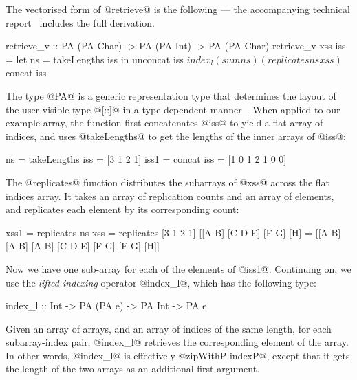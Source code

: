 The vectorised form of @retrieve@ is the following --- the accompanying technical report~\cite{lippmeier-etal:replicate-tr} includes the full derivation.
%
\begin{small}
\begin{code}
 retrieve_v :: PA (PA Char) -> PA (PA Int) -> PA (PA Char)
 retrieve_v xss iss
  = let ns = takeLengths iss
    in  unconcat iss 
         $ index_l (sum ns) (replicates ns xss)
         $ concat iss
\end{code}
\end{small}
\par
The type @PA@ is a generic representation type that determines the layout of the user-visible type @[::]@ in a type-dependent manner~\cite{chak-etal:DPH}. When applied to our example array, the function first concatenates @iss@ to yield a flat array of indices, and uses @takeLengths@ to get the lengths of the inner arrays of @iss@:
\begin{small}
\begin{code}
 ns   = takeLengths iss = [3      1  2    1]
 iss1 = concat iss      = [1 0 1  2  1 0  0]
\end{code}
\end{small}
%
\noindent
The @replicates@ function distributes the subarrays of @xss@ across the flat indices array. It takes an array of replication counts and an array of elements, and replicates each element by its corresponding count:
\begin{small}
\begin{code}
 xss1 = replicates ns xss
      = replicates [3 1 2 1] [[A B] [C D E] [F G] [H]
      = [[A B] [A B] [A B] [C D E] [F G] [F G] [H]]
\end{code}
\end{small}
%
Now we have one sub-array for each of the elements of @iss1@. Continuing on, we use the \emph{lifted indexing} operator @index_l@, which has the following type:
%
\begin{small}
\begin{code}
 index_l :: Int -> PA (PA e) -> PA Int -> PA e
\end{code}
\end{small}
\noindent
Given an array of arrays, and an array of indices of the same length, for each subarray-index pair, @index_l@ retrieves the corresponding element of the array. In other words, @index_l@ is effectively @zipWithP indexP@, except that it gets the length of the two arrays as an additional first argument. 

